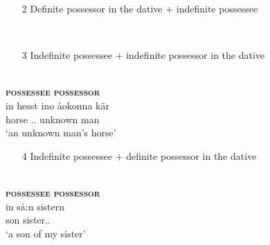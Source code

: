 \z 
\z 

\begin{enumerate}
\item[2] Definite possessor in the dative + indefinite possessee
\end{enumerate} 

\ea%
\\

\z 
\z

\begin{enumerate} 
\item[3] Indefinite possessee + indefinite possessor in the dative
\end{enumerate} 

\ea 
{}\\
\glll \textbf{\textsc{possessee}} \textbf{\textsc{possessor}}\\
in  hesst  ino  åokonna  kär\\
{\indf}  horse  {\indf}.{\dat}.{\m}  unknown  man\\
\glt  ‘an unknown man’s horse’
\z

\begin{enumerate}
\item[4] Indefinite possessee + definite possessor in the dative
\end{enumerate} 


\ea%
\\
\glll \textbf{\textsc{possessee}} \textbf{\textsc{possessor}}\\
in  så:n  sistern\\
{\indf}  son  sister.{}.{\dat}\\
\glt ‘a son of my sister’
\z

